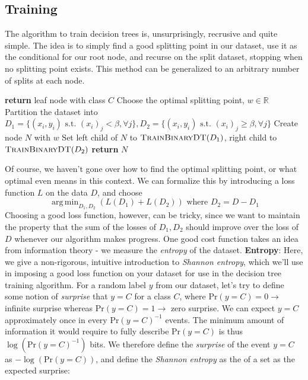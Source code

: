 \documentclass{article}
\DeclareMathOperator*{\argmin}{arg\,min}
\begin{document}
\subsection{Training}
The algorithm to train decision trees is, unsurprisingly, recrusive and quite simple. The idea is to simply find a good splitting point in our dataset, use it as the conditional for our root node, and recurse on the split dataset, stopping when no splitting point exists. This method can be generalized to an arbitrary number of splits at each node.

\begin{algorithmic}
            \State \textbf{return} leaf node with class $ C $
        \Else
            \State Choose the optimal splitting point, $ w \in \mathbb{R} $
            \State Partition the dataset into $ D_1 = \{ (x_i, y_i) \text { s.t. } (x_i)_j < \beta, \forall j \}, D_2 = \{ (x_i, y_i) \text { s.t. } (x_i)_j \geq \beta, \forall j \} $
            \State Create node $ N $  with $ w $
            \State Set left child of $ N $ to $ \textproc{TrainBinaryDT}(D_1) $, right child to $ \textproc{TrainBinaryDT}(D_2) $
            \State \textbf{return} $ N $
        \EndIf
    \EndProcedure
\end{algorithmic}
Of course, we haven't gone over how to find the optimal splitting point, or what optimal even means in this context. We can formalize this by introducing a loss function $ L $ on the data $ D $, and choose
$$ \argmin_{D_1, D_2} (L(D_1) + L(D_2)) \text{ where } D_2 = D - D_1 $$
Choosing a good loss function, however, can be tricky, since we want to maintain the property that the sum of the losses of $ D_1, D_2 $ should improve over the loss of $ D $ whenever our algorithm makes progress. One good cost function takes an idea from information theory - we measure the \textit{entropy} of the dataset. 
\newline \newline
\textbf{Entropy}: Here, we give a non-rigorous, intuitive introduction to \textit{Shannon entropy}, which we'll use in imposing a good loss function on your dataset for use in the decision tree training algorithm. For a random label $ y $ from our dataset, let's try to define some notion of \textit{surprise} that $ y = C $ for a class $ C $, where $ \text{Pr}(y = C) = 0 \rightarrow $ infinite surprise whereas $ \text{Pr}(y = C) = 1 \rightarrow $ zero surprise. We can expect $ y = C $ approximately once in every $ \text{Pr}(y = C)^{-1} $ events. The minimum amount of information it would require to fully describe $ \text{Pr}(y = C) $ is thus $ \log(\text{Pr}(y = C)^{-1}) $ bits. We therefore define the \textit{surprise} of the event $ y = C $ as $ - \log(\text{Pr}(y = C)) $, and define the \textit{Shannon entropy} as the of a set as the expected surprise:
\end{document}
